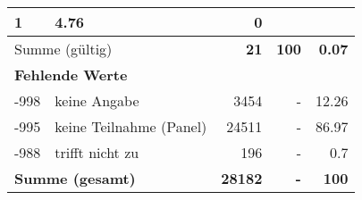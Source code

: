\begin{longtable}{lXrrr}
       \num{1} &
       \num[round-mode=places,round-precision=2]{4,76} &
         \num[round-mode=places,round-precision=2]{0} \\
     \midrule
     \multicolumn{2}{l}{Summe (gültig)} &
       \textbf{\num{21}} &
     \textbf{100} &
       \textbf{\num[round-mode=places,round-precision=2]{0,07}} \\
     \multicolumn{5}{l}{\textbf{Fehlende Werte}}\\
       -998 &
       keine Angabe &
         \num{3454} &
        - &
         \num[round-mode=places,round-precision=2]{12,26} \\
       -995 &
       keine Teilnahme (Panel) &
         \num{24511} &
        - &
         \num[round-mode=places,round-precision=2]{86,97} \\
       -988 &
       trifft nicht zu &
         \num{196} &
        - &
         \num[round-mode=places,round-precision=2]{0,7} \\
     \midrule
     \multicolumn{2}{l}{\textbf{Summe (gesamt)}} &
          \textbf{\num{28182}} &
        \textbf{-} &
        \textbf{100} \\
     \bottomrule
     \end{longtable}
     
